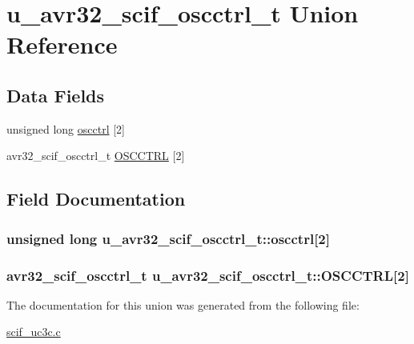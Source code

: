 \hypertarget{unionu__avr32__scif__oscctrl__t}{
\section{u\-\_\-avr32\-\_\-scif\-\_\-oscctrl\-\_\-t \-Union \-Reference}
\label{unionu__avr32__scif__oscctrl__t}
}
\subsection*{\-Data \-Fields}
\begin{DoxyCompactItemize}
\item 
unsigned long \hyperlink{unionu__avr32__scif__oscctrl__t_a7dad485905ddfae2fc273f193824eadb}{oscctrl} \mbox{[}2\mbox{]}
\item 
avr32\-\_\-scif\-\_\-oscctrl\-\_\-t \hyperlink{unionu__avr32__scif__oscctrl__t_a37be34efbc57410513d31b59270e7f4e}{\-O\-S\-C\-C\-T\-R\-L} \mbox{[}2\mbox{]}
\end{DoxyCompactItemize}


\subsection{\-Field \-Documentation}
\hypertarget{unionu__avr32__scif__oscctrl__t_a7dad485905ddfae2fc273f193824eadb}{
\subsubsection[{oscctrl}]{\setlength{\rightskip}{0pt plus 5cm}unsigned long {\bf u\-\_\-avr32\-\_\-scif\-\_\-oscctrl\-\_\-t\-::oscctrl}\mbox{[}2\mbox{]}}}
\label{unionu__avr32__scif__oscctrl__t_a7dad485905ddfae2fc273f193824eadb}
\hypertarget{unionu__avr32__scif__oscctrl__t_a37be34efbc57410513d31b59270e7f4e}{
\subsubsection[{\-O\-S\-C\-C\-T\-R\-L}]{\setlength{\rightskip}{0pt plus 5cm}avr32\-\_\-scif\-\_\-oscctrl\-\_\-t {\bf u\-\_\-avr32\-\_\-scif\-\_\-oscctrl\-\_\-t\-::\-O\-S\-C\-C\-T\-R\-L}\mbox{[}2\mbox{]}}}
\label{unionu__avr32__scif__oscctrl__t_a37be34efbc57410513d31b59270e7f4e}


\-The documentation for this union was generated from the following file\-:\begin{DoxyCompactItemize}
\item 
\hyperlink{scif__uc3c_8c}{scif\-\_\-uc3c.\-c}\end{DoxyCompactItemize}
